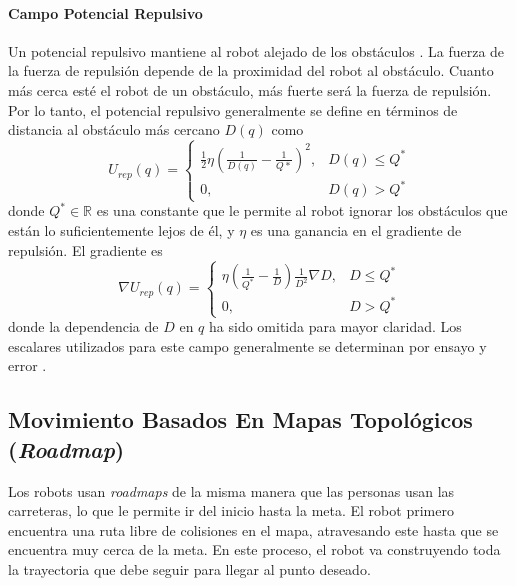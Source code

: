 \paragraph{Campo Potencial Repulsivo}
Un potencial repulsivo mantiene al robot alejado de los obst\'aculos 
\cite{koren1991potential}. La fuerza de la fuerza de repulsi\'on depende de la proximidad 
del robot al obst\'aculo. Cuanto m\'as cerca est\'e el robot de un obst\'aculo, m\'as 
fuerte ser\'a la fuerza de repulsi\'on. Por lo tanto, el potencial 
repulsivo generalmente se define en t\'erminos de distancia al obst\'aculo 
m\'as cercano $D(q)$ como 
\begin{equation}
U_{rep}(q) =
\begin{cases}
	\frac{1}{2}\eta(\frac{1}{D(q)} - \frac{1}{Q*})^2, & D(q)\leq Q^* \\
	0, & D(q) > Q^*
\end{cases}
\label{eq:pot_rep}
\end{equation}
donde $Q^* \in \mathbb R$ es una constante que le permite al robot ignorar 
los obst\'aculos que est\'an lo suficientemente lejos de \'el, y $\eta$ es 
una ganancia en el gradiente de repulsi\'on. El gradiente es 
\begin{equation}
\nabla U_{rep}(q) =
\begin{cases}
	\eta(\frac{1}{Q^*} - \frac{1}{D})\frac{1}{D^2} \nabla D, & D \leq Q^* \\
	0, & D > Q^*
\end{cases}
\label{eqn:gradient_rep}
\end{equation}
donde la dependencia de $D$ en $q$ ha sido omitida para mayor claridad. Los 
escalares utilizados para este campo generalmente se determinan por ensayo 
y error \cite{choset2005principles}.

\subsection{Movimiento Basados En Mapas Topol\'ogicos (\textit{Roadmap})}

Los robots usan \textit{roadmaps} de la misma manera que las personas usan 
las carreteras, lo que le permite ir del inicio hasta la meta. El robot 
primero encuentra una ruta libre de colisiones en el mapa, atravesando este 
hasta que se encuentra muy cerca de la meta. En este proceso, el robot va 
construyendo toda la trayectoria que debe seguir para llegar al punto deseado. 

